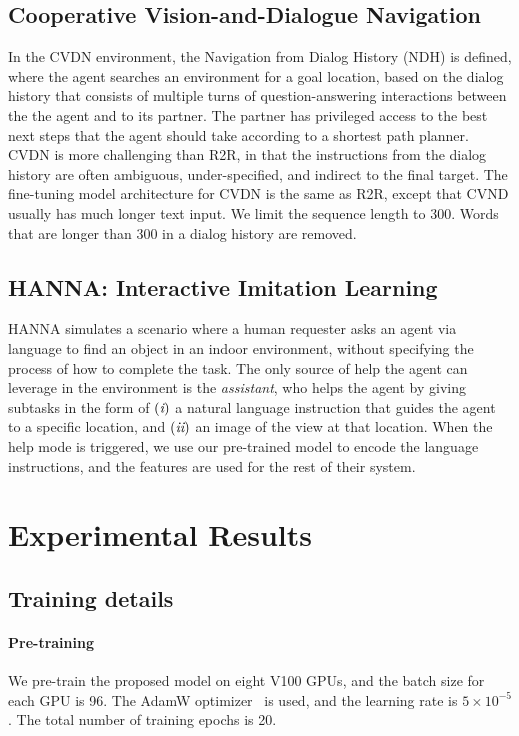 \documentclass[10pt,twocolumn,letterpaper]{article}
\newcommand{\RN}[1]{\textup{\lowercase\expandafter{\it \romannumeral#1}}}
\begin{document}
\subsection{Cooperative Vision-and-Dialogue Navigation}
In the CVDN environment, the Navigation from Dialog History (NDH) is defined, where the agent searches an environment for a goal location, based on the dialog history that consists of multiple turns of question-answering interactions between the the agent and to its partner. The partner has privileged access to the best next steps that the agent should take according to a shortest path planner. CVDN is more challenging than R2R, in that the instructions from the dialog history are often ambiguous, under-specified, and indirect to the final target. The fine-tuning model architecture for CVDN is the same as R2R, except that CVND usually has much longer text input. We limit the sequence length to 300. Words that are longer than 300 in a dialog history are removed.

\subsection{HANNA: Interactive Imitation Learning} 
HANNA simulates a scenario where a human requester asks an agent via language to find an object in an indoor environment, without specifying the process of how to complete the task. The only source of help the agent can leverage in the environment is the {\em assistant}, who helps the agent by giving subtasks in the form of 
$(\RN{1})$ a natural language instruction that guides the agent to a specific location, and 
$(\RN{2})$ an image of the view at that location. When the help mode is triggered, we use our pre-trained model to encode the language instructions, and the features are used for the rest of their system.  



\section{Experimental Results}

\subsection{Training details}
\paragraph{Pre-training} 
We pre-train the proposed model on eight V100 GPUs, and the batch size for each GPU is 96. The AdamW optimizer~\cite{kingma2014adam} is used, and the learning rate is $5\!\times\!10^{-5}$. The total number of training epochs is 20.
\end{document}
